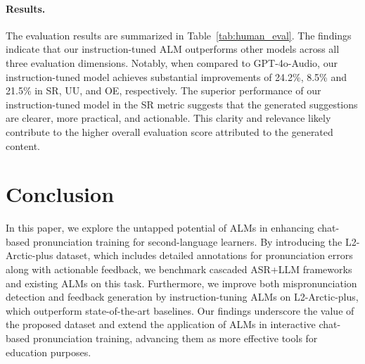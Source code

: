 \documentclass[11pt]{article}
\begin{document}
\paragraph{Results.} The evaluation results are summarized in Table~\ref{tab:human_eval}. The findings indicate that our instruction-tuned ALM outperforms other models across all three evaluation dimensions. Notably, when compared to GPT-4o-Audio, our instruction-tuned model achieves substantial improvements of 24.2\%, 8.5\% and 21.5\% in SR, UU, and OE, respectively. The superior performance of our instruction-tuned model in the SR metric suggests that the generated suggestions are clearer, more practical, and actionable. This clarity and relevance likely contribute to the higher overall evaluation score attributed to the generated content.






\section{Conclusion}
In this paper, we explore the untapped potential of ALMs in enhancing chat-based pronunciation training for second-language learners. By introducing the L2-Arctic-plus dataset, which includes detailed annotations for pronunciation errors along with actionable feedback, we benchmark cascaded ASR+LLM frameworks and existing ALMs on this task. Furthermore, we improve both mispronunciation detection and feedback generation by instruction-tuning ALMs on L2-Arctic-plus, which outperform state-of-the-art baselines. Our findings underscore the value of the proposed dataset and extend the application of ALMs in interactive chat-based pronunciation training, advancing them as more effective tools for education purposes.
\end{document}
